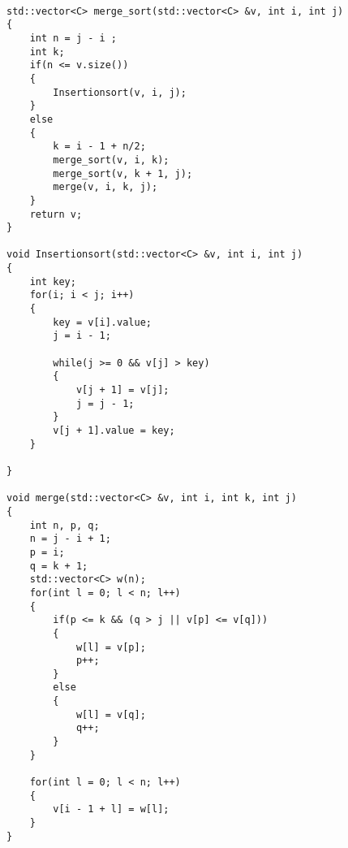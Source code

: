 \begin{lstlisting}

std::vector<C> merge_sort(std::vector<C> &v, int i, int j)
{
    int n = j - i ; 
    int k;
    if(n <= v.size())
    {
        Insertionsort(v, i, j);
    }
    else
    {
        k = i - 1 + n/2;
        merge_sort(v, i, k);
        merge_sort(v, k + 1, j);
        merge(v, i, k, j);
    }
    return v;
}

void Insertionsort(std::vector<C> &v, int i, int j)
{
    int key;
    for(i; i < j; i++)
    {
        key = v[i].value;
        j = i - 1;

        while(j >= 0 && v[j] > key)
        {
            v[j + 1] = v[j];
            j = j - 1;
        }
        v[j + 1].value = key;
    }
    
}

void merge(std::vector<C> &v, int i, int k, int j)
{
    int n, p, q;
    n = j - i + 1;
    p = i;
    q = k + 1;
    std::vector<C> w(n);
    for(int l = 0; l < n; l++)
    {
        if(p <= k && (q > j || v[p] <= v[q]))
        {
            w[l] = v[p];
            p++;
        }
        else
        {
            w[l] = v[q];
            q++;
        }
    }
    
    for(int l = 0; l < n; l++)
    {
        v[i - 1 + l] = w[l];
    }
}

\end{lstlisting}